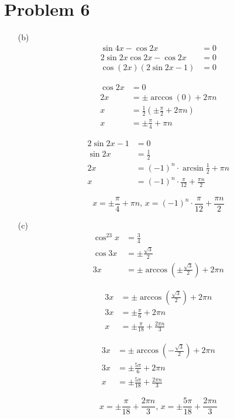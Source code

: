 \documentclass{article}
\begin{document}
\section*{Problem 6}
\begin{itemize}
\item[(b)]
	\begin{align*}
		\sin4x-\cos2x&=0 \\
		2\sin2x\cos2x-\cos2x&=0 \\
		\cos\left(2x\right)\left(2\sin2x-1\right)&=0
	\end{align*}
	\begin{minipage}[t]{.5\textwidth}
		\begin{align*}
			\cos2x&=0 \\
			2x&=\pm\arccos\left(0\right)+2\pi n \\
			x&=\frac{1}{2}\left(\pm\frac{\pi}{2}+2\pi n\right)\\
			x&=\pm\frac{\pi}{4}+\pi n
		\end{align*}
	\end{minipage}
	\begin{minipage}[t]{.5\textwidth}
		\begin{align*}
			2\sin2x-1&=0 \\
			\sin2x&=\frac{1}{2} \\
			2x&=(-1)^n\cdot\arcsin\frac{1}{2}+\pi n \\
			x&=(-1)^n\cdot\frac{\pi}{12}+\frac{\pi n}{2}
		\end{align*}
	\end{minipage}
	\[
		\boxed{x=\pm\frac{\pi}{4}+\pi n,\,
		x=(-1)^n\cdot\frac{\pi}{12}+\frac{\pi n}{2}}
	\]

\item[(c)]
	\begin{align*}
		\cos^23x&=\frac{3}{4} \\
		\cos3x&=\pm\frac{\sqrt{3}}{2} \\
		3x&=\pm\arccos\left(\pm\frac{\sqrt{3}}{2}\right)
			+2\pi n
	\end{align*}
	\begin{minipage}[t]{.5\textwidth}
		\begin{align*}
			3x&=\pm\arccos\left(\frac{\sqrt{3}}{2}\right)
			+2\pi n \\
			3x&=\pm\frac{\pi}{6}+2\pi n \\
			x&=\pm\frac{\pi}{18}+\frac{2\pi n}{3}
		\end{align*}
	\end{minipage}
	\begin{minipage}[t]{.5\textwidth}
		\begin{align*}
			3x&=\pm\arccos\left(-\frac{\sqrt{3}}{2}\right)
			+2\pi n \\
			3x&=\pm\frac{5\pi}{6}+2\pi n \\
			x&=\pm\frac{5\pi}{18}+\frac{2\pi n}{3}
		\end{align*}
	\end{minipage}
	\[
		\boxed{x=\pm\frac{\pi}{18}+\frac{2\pi n}{3},\,
		x=\pm\frac{5\pi}{18}+\frac{2\pi n}{3}}
	\]


\end{itemize}
\end{document}
